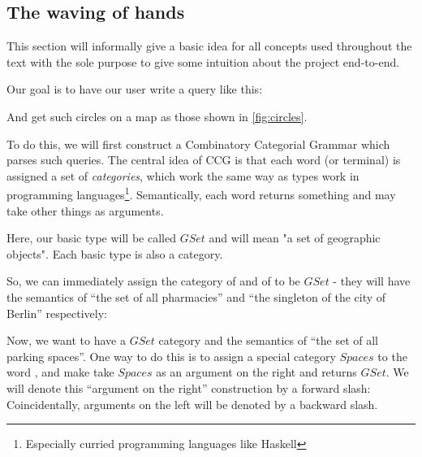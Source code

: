 \documentclass[main.tex]{subfiles}
\begin{document}
\subsection{The waving of hands}
This section will informally give a basic idea for all concepts used throughout the text
with the sole purpose to give some intuition about the project end-to-end.

Our goal is to have our user write a query like this:
\begin{center}
\end{center}
And get such circles on a map as those shown in \cref{fig:circles}.


To do this, we will first construct a Combinatory Categorial Grammar which parses
such queries. The central idea of CCG is that each word (or terminal) is assigned
a set of
\emph{categories}, which work the same way as types work in programming
languages\footnote{Especially curried programming languages like Haskell}.
Semantically, each word returns something and may take other things as arguments.

Here, our basic type will be called $GSet$ and will mean "a set of geographic
objects". Each basic type is also a category.

So, we can immediately assign the category of  and of
 to be $GSet$ - they will have the semantics of ``the set of all
pharmacies'' and ``the singleton of the city of Berlin'' respectively:

Now, we want  to have a $GSet$ category and the semantics
of ``the set of all parking spaces''. One way to do this is to assign a special
category $Spaces$ to the word , and make  take
$Spaces$ as an argument on the right and returns $GSet$. We will denote this
``argument on the right'' construction by a forward slash:
Coincidentally, arguments on the left will be denoted by a backward slash.
\end{document}

